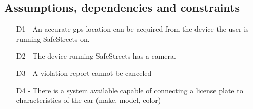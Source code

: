 \subsection{Assumptions, dependencies and constraints}

\begin{itemize}
\item
[D1] - An accurate gps location can be acquired from the device the user is running SafeStreets on.
\item
[D2] - The device running SafeStreets has a camera.
\item
[D3] - A violation report cannot be canceled
\item
[D4] - There is a system available capable of connecting a license plate to characteristics of the car (make, model, color)
\end{itemize}




